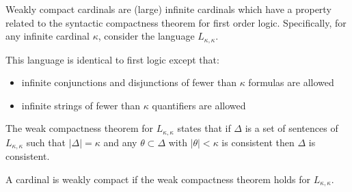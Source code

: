 \documentclass[12pt]{article}
\begin{document}
Weakly compact cardinals are (large) infinite cardinals which have a property related to the syntactic compactness theorem for first order logic.  Specifically, for any infinite cardinal $\kappa$, consider the language $L_{\kappa,\kappa}$.  

This language is identical to  first  logic except that:

\begin{itemize}
\item infinite conjunctions and disjunctions of fewer than $\kappa$ formulas are allowed
\item infinite strings of fewer than $\kappa$ quantifiers are allowed
\end{itemize}

The weak compactness theorem for $L_{\kappa,\kappa}$ states that if $\Delta$ is a set of sentences of $L_{\kappa,\kappa}$ such that $|\Delta|=\kappa$ and any $\theta\subset\Delta$ with $|\theta|<\kappa$ is consistent then $\Delta$ is consistent.

A cardinal is weakly compact if the weak compactness theorem holds for $L_{\kappa,\kappa}$.
\end{document}
